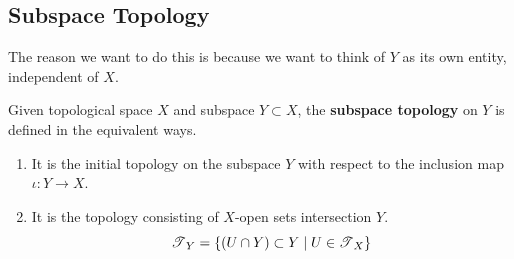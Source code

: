 \subsection{Subspace Topology} 

  The reason we want to do this is because we want to think of $Y$ as its own entity, independent of $X$. 

  \begin{definition}
    Given topological space $X$ and subspace $Y \subset X$, the \textbf{subspace topology} on $Y$ is defined in the equivalent ways. 
    \begin{enumerate}
      \item It is the initial topology on the subspace $Y$ with respect to the inclusion map $\iota: Y \rightarrow X$. 
      \item It is the topology consisting of $X$-open sets intersection $Y$. 
      \begin{equation}
        \T_Y = \{(U \cap Y) \subset Y \mid U \in \T_X\}
      \end{equation}
    \end{enumerate}

    \begin{figure}[H]
      \centering
      \begin{subfigure}[b]{0.48\textwidth}
        \centering
\end{subfigure}
\end{figure}
\end{definition}
